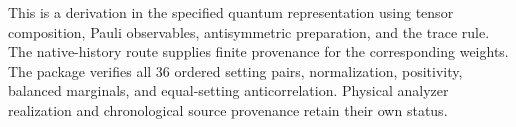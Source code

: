 This is a derivation in the specified quantum representation using tensor composition, Pauli observables, antisymmetric preparation, and the trace rule. The native-history route supplies finite provenance for the corresponding weights. The package verifies all 36 ordered setting pairs, normalization, positivity, balanced marginals, and equal-setting anticorrelation. Physical analyzer realization and chronological source provenance retain their own status.


